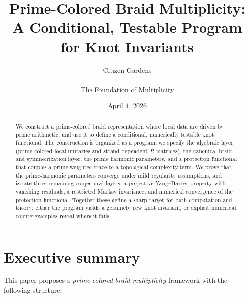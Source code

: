 \documentclass[11pt]{article}
\title{Prime-Colored Braid Multiplicity:\\
A Conditional, Testable Program for Knot Invariants}
\author{Citizen Gardens \\ \\ The Foundation of Multiplicity}
\date{April 4, 2026}
\begin{document}
\maketitle

\begin{abstract}
We construct a prime-colored braid representation whose local data are driven by prime arithmetic, and use it to define a conditional, numerically testable knot functional.
The construction is organized as a program: we specify the algebraic layer (prime-colored local unitaries and strand-dependent $R$-matrices), the canonical braid and symmetrization layer, the prime-harmonic parameters, and a protection functional that couples a prime-weighted trace to a topological complexity term.
We prove that the prime-harmonic parameters converge under mild regularity assumptions, and isolate three remaining conjectural layers: a projective Yang--Baxter property with vanishing residuals, a restricted Markov invariance, and numerical convergence of the protection functional.
Together these define a sharp target for both computation and theory: either the program yields a genuinely new knot invariant, or explicit numerical counterexamples reveal where it fails.
\end{abstract}

\section{Executive summary}

This paper proposes a \emph{prime-colored braid multiplicity} framework with the following structure.
\end{document}
